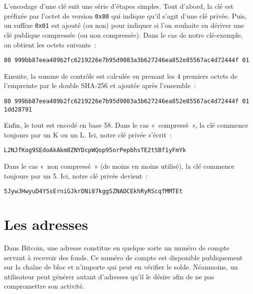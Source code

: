 L'encodage d'une clé suit une série d'étapes simples. Tout d'abord, la clé est préfixée par l'octet de version \verb?0x80? qui indique qu'il s'agit d'une clé privée. Puis, un suffixe \verb?0x01? est ajouté (ou non) pour indiquer si l'on souhaite en dériver une clé publique compressée (ou non compressée). Dans le cas de notre clé-exemple, on obtient les octets suivants~:

\begin{Verbatim}[fontsize=\footnotesize]
80 999bb87eea489b2fc6219226e7b95d9083a3b627246ea852e85567ac4d72444f 01
\end{Verbatim}

Ensuite, la somme de contrôle est calculée en prenant les 4 premiers octets de l'empreinte par le double SHA-256 et ajoutée après l'ensemble~:


\begin{Verbatim}[fontsize=\footnotesize]
80 999bb87eea489b2fc6219226e7b95d9083a3b627246ea852e85567ac4d72444f 01
1dd28791
\end{Verbatim}

Enfin, le tout est encodé en base 58. Dans le cas «~compressé~», la clé commence toujours par un K ou un L. Ici, notre clé privée s'écrit~:

\begin{Verbatim}[fontsize=\footnotesize]
L2NJfKog9SEdoAkAkm8ZNYDcpWQop95orPepbhsTE2t5Bf1yFmYk
\end{Verbatim}

Dans le cas «~non compressé~» (de moins en moins utilisé), la clé commence toujours par un 5. Ici, notre clé privée devient~:

\begin{Verbatim}[fontsize=\footnotesize]
5JywJHwyuD4YSsErniGJkrDNi87kggSZNADCEkhRyRScqfMMTEt
\end{Verbatim}

\section*{Les adresses}

Dans Bitcoin, une adresse constitue en quelque sorte un numéro de compte servant à recevoir des fonds. Ce numéro de compte est disponible publiquement sur la chaîne de bloc et n'importe qui peut en vérifier le solde. Néanmoins, un utilisateur peut générer autant d'adresses qu'il le désire afin de ne pas compromettre son activité.


